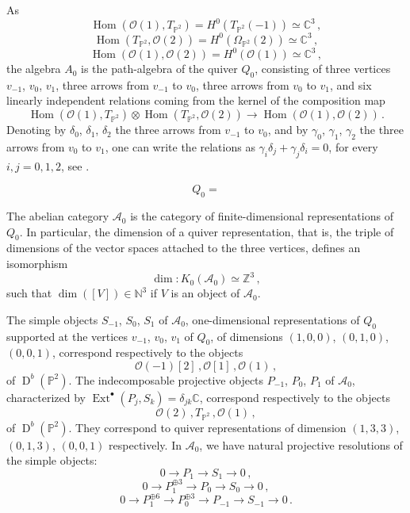 \documentclass[12pt, a4paper]{amsart}
\newcommand\C{\mathbb C}
\newcommand\NN{\mathbb N}
\newcommand\PP{\mathbb P}
\newcommand\Z{\mathbb Z}
\newcommand\cA{\mathcal A}
\newcommand\cO{\mathcal O}
\newcommand\Ext{\operatorname{Ext}}
\newcommand\Hom{\operatorname{Hom}}
\newcommand\D{\operatorname{D}}
\begin{document}
As 
\[ \Hom(\cO(1),T_{\PP^2})=H^0(T_{\PP^2}(-1)) \simeq \C^3 \,,\]
\[ \Hom(T_{\PP^2},\cO(2))
=H^0(\Omega_{\PP^2}(2)) \simeq \C^3 \,,\]
\[ \Hom(\cO(1),\cO(2)) =H^0(\cO(1))
\simeq \C^3\,,\]
the algebra $A_0$ is the path-algebra of the quiver $Q_0$, consisting of three vertices $v_{-1}$, $v_0$, $v_1$, three arrows from $v_{-1}$ to $v_0$, three arrows from 
$v_0$ to $v_1$, and six linearly independent relations coming from the kernel of the composition map
\[ \Hom(\cO(1),T_{\PP^2}) \otimes \Hom(T_{\PP^2},\cO(2)) \rightarrow \Hom(\cO(1),\cO(2))\,.\]
Denoting by $\delta_0$, 
$\delta_1$, $\delta_2$ the three arrows from $v_{-1}$ to $v_0$, and 
by $\gamma_0$,
$\gamma_1$, $\gamma_2$ the three arrows from $v_0$ to $v_1$, one can write the relations as 
$\gamma_i \delta_j+\gamma_j \delta_i=0$, for every $i,j=0,1,2$, see 
\cite[\S 4.3]{MR2681544}.

\[Q_0=\]
\begin{center}
\end{center}
The abelian category $\cA_0$ is the category of finite-dimensional 
representations of $Q_0$. 
In particular, the dimension of a quiver representation, that is, the triple of dimensions of the vector spaces attached to the three vertices, defines an isomorphism
\[ \dim \colon K_0(\cA_0) \simeq \Z^3\,,\]
such that $\dim([V]) \in \NN^3$ if 
$V$ is an object of $\cA_0$.

The simple objects $S_{-1}$, $S_0$, $S_1$
of $\cA_0$, one-dimensional representations of $Q_0$ supported at the vertices 
$v_{-1}$, $v_0$, $v_1$ of $Q_0$, of dimensions $(1,0,0)$, 
$(0,1,0)$, $(0,0,1)$, 
correspond respectively to the objects 
\[ \cO(-1)[2]\,,\cO[1] \,, \cO(1) \,,\]
of $\D^b(\PP^2)$. The indecomposable 
projective objects 
$P_{-1}$, $P_0$, $P_1$ of 
$\cA_0$, characterized by 
$\Ext^{\bullet}(P_j,S_k)=\delta_{jk} \C$,
correspond respectively to the objects
\[ \cO(2)\,, T_{\PP^2} \,,\cO(1) \,,\]
of $\D^b(\PP^2)$.
They correspond to quiver representations of dimension 
$(1,3,3)$, $(0,1,3)$, $(0,0,1)$ respectively.
In $\cA_0$, we have natural projective resolutions of the simple objects:
\[ 0 \rightarrow P_1 \rightarrow S_1 \rightarrow 0\,,\]
\[ 0 \rightarrow P_1^{ \oplus 3} \rightarrow P_0 \rightarrow S_0 \rightarrow 0\,,\]
\[ 0 \rightarrow P_1^{\oplus 6} \rightarrow 
P_0^{\oplus 3} \rightarrow P_{-1}
\rightarrow S_{-1} \rightarrow 0\,.\]
\end{document}
